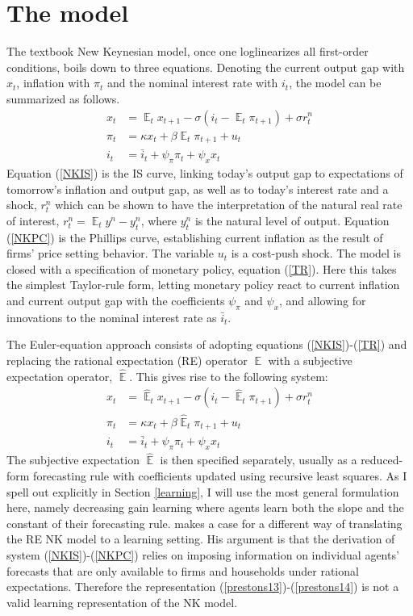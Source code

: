 \documentclass[11pt]{article}
\renewcommand{\[}{\begin{equation}}
\renewcommand{\]}{\end{equation}}
\DeclareMathOperator{\E}{\mathbb{E}}
\begin{document}
\section{The model}\label{models}
The textbook New Keynesian model, once one loglinearizes all first-order conditions, boils down to three equations. Denoting the current output gap with $x_t$, inflation with $\pi_t$ and the nominal interest rate with $i_t$, the model can be summarized as follows.
\begin{align}
x_t &= \E_t x_{t+1} - \sigma(i_t - \E_t \pi_{t+1}) +\sigma r_t^n \label{NKIS} \\
\pi_t &= \kappa x_t +\beta \E_t \pi_{t+1} + u_t  \label{NKPC} \\
i_t &= \bar{i}_t + \psi_{\pi}\pi_t + \psi_{x} x_t  \label{TR}
\end{align}
Equation (\ref{NKIS}) is the IS curve, linking today's output gap to expectations of tomorrow's inflation and output gap, as well as to today's interest rate and a shock, $r_t^n$ which can be shown to have the interpretation of the natural real rate of interest, $r_t^n = \E_t y^n - y_t^n$, where $y^n_t$ is the natural level of output. Equation (\ref{NKPC}) is the Phillips curve, establishing current inflation as the result of firms' price setting behavior. The variable $u_t$ is a cost-push shock. The model is closed with a specification of monetary policy, equation (\ref{TR}). Here this takes the simplest Taylor-rule form, letting monetary policy react to current inflation and current output gap with the coefficients $\psi_{\pi}$ and $\psi_x$, and allowing for innovations to the nominal interest rate as $\bar{i}_t$.

The Euler-equation approach consists of adopting equations (\ref{NKIS})-(\ref{TR}) and replacing the rational expectation (RE) operator $\E$ with a subjective expectation operator, $\hat{\E}$. This gives rise to the following system:
\begin{align}
x_t &= \hat{\E}_t x_{t+1} - \sigma(i_t - \hat{\E}_t \pi_{t+1}) +\sigma r_t^n \label{prestons13} \\
\pi_t &= \kappa x_t +\beta \hat{\E}_t \pi_{t+1} + u_t \label{prestons14}  \\
i_t &= \bar{i}_t + \psi_{\pi}\pi_t + \psi_{x} x_t 
\end{align}
The subjective expectation $\hat{\E}$ is then specified separately, usually as a reduced-form forecasting rule with coefficients updated using recursive least squares. As I spell out explicitly in Section \ref{learning}, I will use the most general formulation here, namely decreasing gain learning where agents learn both the slope and the constant of their forecasting rule. 
\cite{preston2005} makes a case for a different way of translating the RE NK model to a learning setting. His argument is that the derivation of system (\ref{NKIS})-(\ref{NKPC}) relies on imposing information on individual agents' forecasts that are only available to firms and households under rational expectations. Therefore the representation (\ref{prestons13})-(\ref{prestons14}) is not a valid learning representation of the NK model. 
\end{document}
